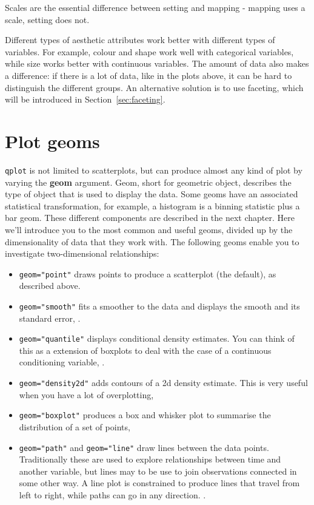 Scales are the essential difference between setting and mapping - mapping uses a scale, setting does not.



Different types of aesthetic attributes work better with different types of variables.  For example, colour and shape work well with categorical variables, while size works better with continuous variables.  The amount of data also makes a difference: if there is a lot of data, like in the plots above, it can be hard to distinguish the different groups.  An alternative solution is to use faceting, which will be introduced in Section~\ref{sec:faceting}.

\section{Plot geoms}\label{sec:plot_geoms}

{\tt qplot} is not limited to scatterplots, but can produce almost any kind of plot by varying the {\bf geom} argument. Geom, short for geometric object, describes the type of object that is used to display the data.  Some geoms have an associated statistical transformation, for example, a histogram is a binning statistic plus a bar geom.  These different components are described in the next chapter.  Here we'll introduce you to the most common and useful geoms, divided up by the dimensionality of data that they work with.  The following geoms enable you to investigate two-dimensional relationships:

\begin{itemize}

	\item {\tt geom="point"} draws points to produce a scatterplot (the default), as described above.

	\item {\tt geom="smooth"} fits a smoother to the data and displays the smooth and its standard error, .

	\item {\tt geom="quantile"} displays conditional density estimates.  You can think of this as a extension of boxplots to deal with the case of a continuous conditioning variable, .

	\item {\tt geom="density2d"} adds contours of a 2d density estimate.  This is very useful when you have a lot of overplotting, 

	\item {\tt geom="boxplot"} produces a box and whisker plot to summarise the distribution of a set of points, 

	\item {\tt geom="path"} and {\tt geom="line"} draw lines between the data points.  Traditionally these are used to explore relationships between time and another variable, but lines may to be use to join observations connected in some other way.  A line plot is constrained to produce lines that travel from left to right, while paths can go in any direction.  .
\end{itemize}

